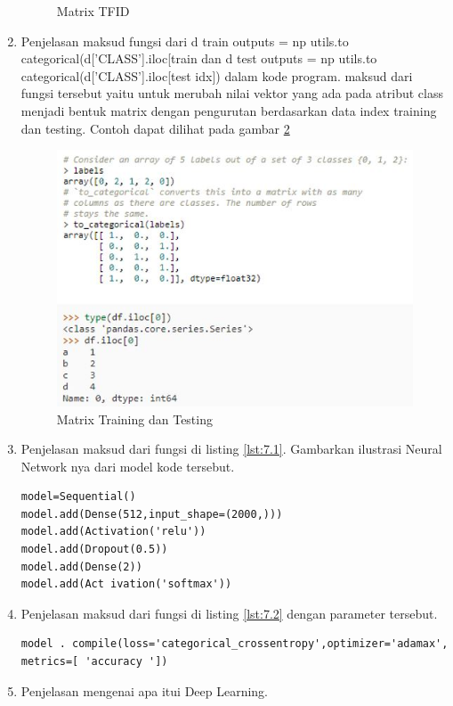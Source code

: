 \begin{enumerate}
\begin{figure}[!htbp]
\caption{Matrix TFID}
\label{c7t_4}
\end{figure}
\item Penjelasan maksud fungsi dari d train outputs = np utils.to categorical(d['CLASS'].iloc[train dan d test outputs = np utils.to categorical(d['CLASS'].iloc[test idx]) dalam kode program.
\subitem maksud dari fungsi tersebut yaitu untuk merubah nilai vektor yang ada pada atribut class menjadi bentuk matrix dengan pengurutan berdasarkan data index training dan testing. Contoh dapat dilihat pada gambar \ref{c7t_5}
\begin{figure}[!htbp]
\centerline{\includegraphics[width=1\textwidth]{figures/c7t/5.JPG}}
\caption{Matrix Training dan Testing}
\label{c7t_5}
\end{figure}
\item Penjelasan maksud dari fungsi di listing \ref{lst:7.1}. Gambarkan ilustrasi Neural Network nya dari model kode tersebut.
\begin{lstlisting}[caption=Neural Network,label={lst:7.1}]
model=Sequential()
model.add(Dense(512,input_shape=(2000,)))
model.add(Activation('relu'))
model.add(Dropout(0.5))
model.add(Dense(2))
model.add(Act ivation('softmax'))
\end{lstlisting}
\item Penjelasan maksud dari fungsi di listing \ref{lst:7.2} dengan parameter tersebut.
\begin{lstlisting}[caption=Model Compile Metric,label={lst:7.2}]
model . compile(loss='categorical_crossentropy',optimizer='adamax',
metrics=[ 'accuracy '])
\end{lstlisting}
\item Penjelasan mengenai apa itui Deep Learning.

\end{enumerate}
